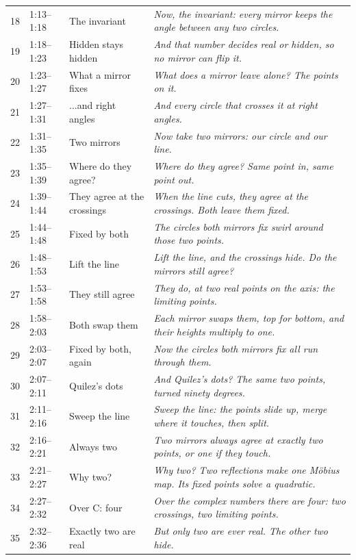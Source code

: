\documentclass[10pt]{article}
\begin{document}
{\begin{longtable}{rllp{}}
18 & 1:13--1:18 & The invariant & \emph{Now, the invariant: every mirror keeps the angle between any two circles.}\\
19 & 1:18--1:23 & Hidden stays hidden & \emph{And that number decides real or hidden, so no mirror can flip it.}\\
20 & 1:23--1:27 & What a mirror fixes & \emph{What does a mirror leave alone? The points on it.}\\
21 & 1:27--1:31 & ...and right angles & \emph{And every circle that crosses it at right angles.}\\
22 & 1:31--1:35 & Two mirrors & \emph{Now take two mirrors: our circle and our line.}\\
23 & 1:35--1:39 & Where do they agree? & \emph{Where do they agree? Same point in, same point out.}\\
24 & 1:39--1:44 & They agree at the crossings & \emph{When the line cuts, they agree at the crossings. Both leave them fixed.}\\
25 & 1:44--1:48 & Fixed by both & \emph{The circles both mirrors fix swirl around those two points.}\\
26 & 1:48--1:53 & Lift the line & \emph{Lift the line, and the crossings hide. Do the mirrors still agree?}\\
27 & 1:53--1:58 & They still agree & \emph{They do, at two real points on the axis: the limiting points.}\\
28 & 1:58--2:03 & Both swap them & \emph{Each mirror swaps them, top for bottom, and their heights multiply to one.}\\
29 & 2:03--2:07 & Fixed by both, again & \emph{Now the circles both mirrors fix all run through them.}\\
30 & 2:07--2:11 & Quilez's dots & \emph{And Quilez's dots? The same two points, turned ninety degrees.}\\
31 & 2:11--2:16 & Sweep the line & \emph{Sweep the line: the points slide up, merge where it touches, then split.}\\
32 & 2:16--2:21 & Always two & \emph{Two mirrors always agree at exactly two points, or one if they touch.}\\
33 & 2:21--2:27 & Why two? & \emph{Why two? Two reflections make one Möbius map. Its fixed points solve a quadratic.}\\
34 & 2:27--2:32 & Over C: four & \emph{Over the complex numbers there are four: two crossings, two limiting points.}\\
35 & 2:32--2:36 & Exactly two are real & \emph{But only two are ever real. The other two hide.}\\

\end{longtable}}
\end{document}
